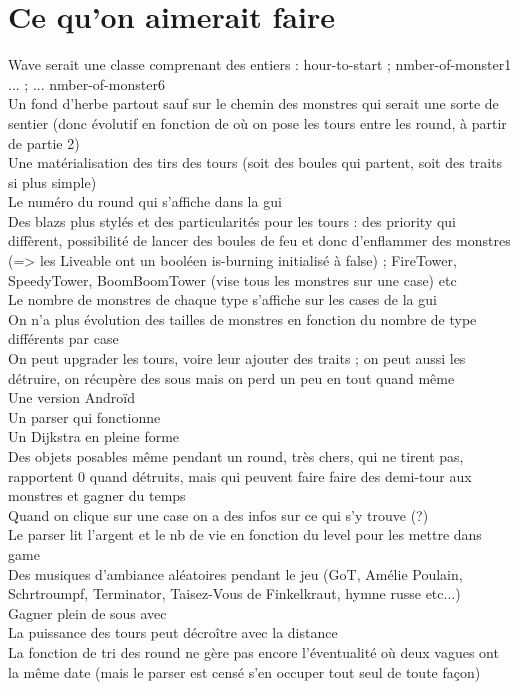 \documentclass{article}
\begin{document}
\section{Ce qu'on aimerait faire}
Wave serait une classe comprenant des entiers : hour-to-start ; nmber-of-monster1 ... ; ... nmber-of-monster6\\
Un fond d'herbe partout sauf sur le chemin des monstres qui serait une sorte de sentier (donc évolutif en fonction de où on pose les tours entre les round, à partir de partie 2)\\
    Une matérialisation des tirs des tours (soit des boules qui partent, soit des traits si plus simple)\\
    Le numéro du round qui s'affiche dans la gui\\
    Des blazs plus stylés et des particularités pour les tours : des priority qui diffèrent, possibilité de lancer des boules de feu et donc d'enflammer des monstres (=> les Liveable ont un booléen is-burning initialisé à false) ; FireTower, SpeedyTower, BoomBoomTower (vise tous les monstres sur une case) etc\\
    Le nombre de monstres de chaque type s'affiche sur les cases de la gui\\
    On n'a plus évolution des tailles de monstres en fonction du nombre de type différents par case\\
    On peut upgrader les tours, voire leur ajouter des traits ; on peut aussi les détruire, on récupère des sous mais on perd un peu en tout quand même\\
    Une version Androïd\\
    Un parser qui fonctionne\\
    Un Dijkstra en pleine forme\\
    Des objets posables même pendant un round, très chers, qui ne tirent pas, rapportent 0 quand détruits, mais qui peuvent faire faire des demi-tour aux monstres et gagner du temps\\
    Quand on clique sur une case on a des infos sur ce qui s'y trouve (?)\\
    Le parser lit l'argent et le nb de vie en fonction du level pour les mettre dans game\\
    Des musiques d'ambiance aléatoires pendant le jeu (GoT, Amélie Poulain, Schrtroumpf, Terminator, Taisez-Vous de Finkelkraut, hymne russe etc...)\\
    Gagner plein de sous avec\\
    La puissance des tours peut décroître avec la distance\\
    La fonction de tri des round ne gère pas encore l'éventualité où deux vagues ont la même date (mais le parser est censé s'en occuper tout seul de toute façon)\\
\end{document}
